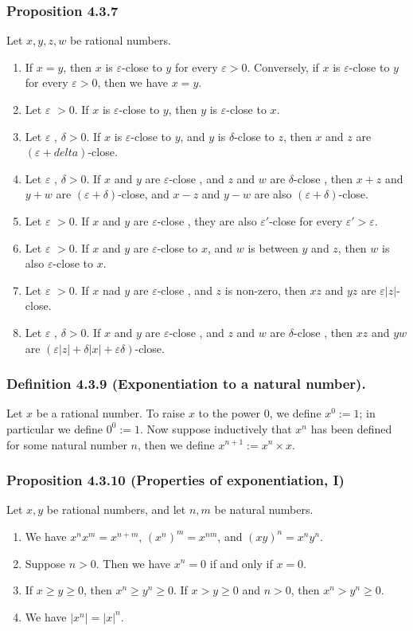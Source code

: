 \documentclass[12pt, letter]{article}
\newcommand{\ec}{$\varepsilon$-close }
\newcommand{\dc}{$\delta$-close }
\newcommand{\ve}{$\varepsilon$ }
\begin{document}
\subsubsection*{Proposition 4.3.7}
Let $x,y,z,w$ be rational numbers.
\begin{enumerate}[label=(\alph*)]
    \item If $x=y$, then $x$ is \ec to $y$ for every $\varepsilon>0$. Conversely, if $x$ is \ec to $y$ for every $\varepsilon>0$, then we have $x=y$.
    \item Let \ve$>0$. If $x$ is \ec to $y$, then $y$ is \ec to $x$.
    \item Let \ve, $\delta>0$. If $x$ is \ec to $y$, and $y$ is \dc to $z$, then $x$ and $z$ are $(\varepsilon+delta)$-close.
    \item Let \ve, $\delta>0$. If $x$ and $y$ are \ec, and $z$ and $w$ are \dc, then $x+z$ and $y+w$ are $(\varepsilon+\delta)$-close, and $x-z$ and $y-w$ are 
    also $(\varepsilon+\delta)$-close.
    \item Let \ve$>0$. If $x$ and $y$ are \ec, they are also $\varepsilon'$-close for every $\varepsilon'>\varepsilon$.
    \item Let \ve$>0$. If $x$ and $y$ are \ec to $x$, and $w$ is between $y$ and $z$, then $w$ is also \ec to $x$.
    \item Let \ve$>0$. If $x$ nad $y$ are \ec, and $z$ is non-zero, then $xz$ and $yz$ are $\varepsilon|z|$-close.
    \item Let \ve, $\delta>0$. If $x$ and $y$ are \ec, and $z$ and $w$ are \dc, then $xz$ and $yw$ are $(\varepsilon|z|+\delta|x|+\varepsilon\delta)$-close.
\end{enumerate} 
\subsubsection*{Definition 4.3.9 (Exponentiation to a natural number).}
Let $x$ be a rational number. To raise $x$ to the power 0, we define $x^0:=1$; in particular we define $0^0:=1$. Now suppose inductively that $x^n$ has been defined 
for some natural number $n$, then we define $x^{n+1}:=x^n\times x$. 
\subsubsection*{Proposition 4.3.10 (Properties of exponentiation, I)}
Let $x,y$ be rational numbers, and let $n,m$ be natural numbers.
\begin{enumerate}[label=(\alph*)]
    \item We have $x^n x^m=x^{n+m}$, $(x^n)^m=x^{nm}$, and $(xy)^n=x^n y^n$.
    \item Suppose $n>0$. Then we have $x^n=0$ if and only if $x=0$.
    \item If $x\geq y\geq 0$, then $x^n\geq y^n\geq 0$. If $x>y\geq 0$ and $n>0$, then $x^n>y^n\geq 0$.
    \item We have $|x^n|=|x|^n$.
\end{enumerate} 
\end{document}
